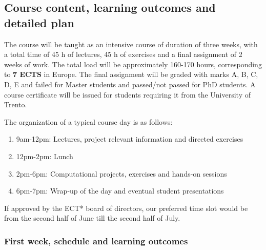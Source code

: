 \documentclass[superscriptaddress,amsmath,amssymb,aps,floatfix]{revtex4-2}
\begin{document}
\subsection{Course content, learning outcomes and detailed plan}

The course will be taught as an intensive course of duration of three
weeks, with a total time of 45 h of lectures, 45 h of exercises and a
final assignment of 2 weeks of work. The total load will be
approximately 160-170 hours, corresponding to \textbf{7 ECTS} in
Europe.  The final assignment will be graded with marks A, B, C, D, E
and failed for Master students and passed/not passed for PhD
students. A course certificate will be issued for students requiring
it from the University of Trento.

The organization of a typical course day is as follows:

\begin{enumerate}
\def\labelenumi{\arabic{enumi}.}
\item
  9am-12pm: Lectures, project relevant information and directed
  exercises
\item
  12pm-2pm: Lunch
\item
  2pm-6pm: Computational projects, exercises and hands-on sessions
\item
  6pm-7pm: Wrap-up of the day and eventual student presentations
\end{enumerate}

If approved by the ECT* board of directors, our preferred time slot
would be from the second half of June till the second half of July.


\subsubsection{First week, schedule and learning outcomes}
\end{document}
